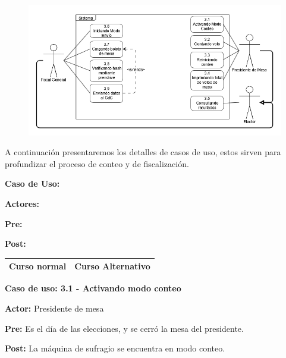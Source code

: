 \begin{figure}[h!]
\centering
\includegraphics[scale=0.5]{imagenes/CU/casosdeusoconteo}
\end{figure}			

A continuación presentaremos los detalles de casos de uso, estos sirven para profundizar el proceso de conteo y de fiscalización.

\textbf{Caso de Uso: }

\textbf{Actores:} 

\textbf{Pre:} 

\textbf{Post:}
\begin{table}[h!]
	
 \begin{tabular}{|p{7.5cm} | p{7.5cm}|} 
 \hline
 \textbf{Curso normal} & \textbf{Curso Alternativo} \\
 \hline

 \end{tabular}

\end{table}



\textbf{Caso de uso: 3.1 - Activando modo conteo}

\textbf{Actor:} Presidente de mesa

\textbf{Pre:} Es el día de las elecciones, y se cerró la mesa del presidente.

\textbf{Post:} La máquina de sufragio se encuentra en modo conteo.

